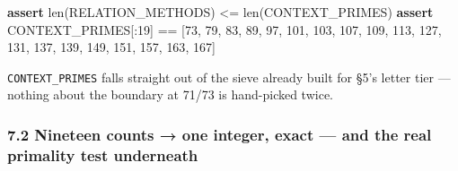 \documentclass[
  10pt,
]{article}
\newenvironment{Shaded}{}{}
\newcommand{\BuiltInTok}[1]{\textcolor[rgb]{0.00,0.50,0.00}{#1}}
\newcommand{\ControlFlowTok}[1]{\textcolor[rgb]{0.00,0.44,0.13}{\textbf{#1}}}
\newcommand{\DecValTok}[1]{\textcolor[rgb]{0.25,0.63,0.44}{#1}}
\newcommand{\NormalTok}[1]{#1}
\newcommand{\OperatorTok}[1]{\textcolor[rgb]{0.40,0.40,0.40}{#1}}
\begin{document}
\begin{Shaded}
\begin{Highlighting}[]
\ControlFlowTok{assert} \BuiltInTok{len}\NormalTok{(RELATION\_METHODS) }\OperatorTok{\textless{}=} \BuiltInTok{len}\NormalTok{(CONTEXT\_PRIMES)}
\ControlFlowTok{assert}\NormalTok{ CONTEXT\_PRIMES[:}\DecValTok{19}\NormalTok{] }\OperatorTok{==}\NormalTok{ [}\DecValTok{73}\NormalTok{, }\DecValTok{79}\NormalTok{, }\DecValTok{83}\NormalTok{, }\DecValTok{89}\NormalTok{, }\DecValTok{97}\NormalTok{, }\DecValTok{101}\NormalTok{, }\DecValTok{103}\NormalTok{, }\DecValTok{107}\NormalTok{, }\DecValTok{109}\NormalTok{, }\DecValTok{113}\NormalTok{,}
                                \DecValTok{127}\NormalTok{, }\DecValTok{131}\NormalTok{, }\DecValTok{137}\NormalTok{, }\DecValTok{139}\NormalTok{, }\DecValTok{149}\NormalTok{, }\DecValTok{151}\NormalTok{, }\DecValTok{157}\NormalTok{, }\DecValTok{163}\NormalTok{, }\DecValTok{167}\NormalTok{]}
\end{Highlighting}
\end{Shaded}

\texttt{CONTEXT\_PRIMES} falls straight out of the sieve already built
for §5's letter tier --- nothing about the boundary at 71/73 is
hand-picked twice.

\hypertarget{nineteen-counts-one-integer-exact-and-the-real-primality-test-underneath}{%
\subsubsection{7.2 Nineteen counts → one integer, exact --- and the real
primality test
underneath}\label{nineteen-counts-one-integer-exact-and-the-real-primality-test-underneath}}
\end{document}
